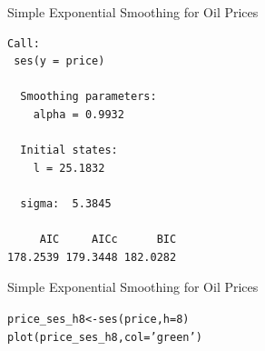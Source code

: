 \documentclass{beamer}\usepackage[]{graphicx}\usepackage[]{color}
\makeatletter
\newcommand{\hlnum}[1]{\textcolor[rgb]{0.824,0.412,0.118}{#1}}%
\newcommand{\hlstr}[1]{\textcolor[rgb]{1,0.894,0.71}{#1}}%
\newcommand{\hlstd}[1]{\textcolor[rgb]{1,0.894,0.769}{#1}}%
\newcommand{\hlkwb}[1]{\textcolor[rgb]{0.804,0.776,0.451}{#1}}%
\newcommand{\hlkwc}[1]{\textcolor[rgb]{0.78,0.941,0.545}{#1}}%
\newcommand{\hlkwd}[1]{\textcolor[rgb]{1,0.78,0.769}{#1}}%
\newenvironment{kframe}{%
 \def\at@end@of@kframe{}%
 \ifinner\ifhmode%
  \def\at@end@of@kframe{\end{minipage}}%
  \begin{minipage}{\columnwidth}%
 \fi\fi%
 \def\FrameCommand##1{\hskip\@totalleftmargin \hskip-\fboxsep
 \colorbox{shadecolor}{##1}\hskip-\fboxsep
     \hskip-\linewidth \hskip-\@totalleftmargin \hskip\columnwidth}%
 \MakeFramed {\advance\hsize-\width
   \@totalleftmargin\z@ \linewidth\hsize
   \@setminipage}}%
 {\par\unskip\endMakeFramed%
 \at@end@of@kframe}
\newenvironment{knitrout}{}{} %
\makeatother
\begin{document}
\begin{darkframes}
\begin{frame}[fragile]{Simple Exponential Smoothing for Oil Prices}
\begin{knitrout}
\begin{kframe}
\begin{verbatim}
Call:
 ses(y = price) 

  Smoothing parameters:
    alpha = 0.9932 

  Initial states:
    l = 25.1832 

  sigma:  5.3845

     AIC     AICc      BIC 
178.2539 179.3448 182.0282 
\end{verbatim}
\end{kframe}
\end{knitrout}
      \lc
    \end{frame}
    
    
    \begin{frame}[fragile]{Simple Exponential Smoothing for Oil Prices}
      \fontsize{8}{8}\selectfont
\begin{knitrout}
\begin{kframe}
\begin{alltt}
\hlstd{price_ses_h8} \hlkwb{<-} \hlkwd{ses}\hlstd{(price,} \hlkwc{h}\hlstd{=}\hlnum{8}\hlstd{)}
\hlkwd{plot}\hlstd{(price_ses_h8,} \hlkwc{col}\hlstd{=}\hlstr{'green'}\hlstd{)}
\end{alltt}
\end{kframe}


\end{knitrout}
    \end{frame}
    
    
    
  \end{darkframes}
\end{document}
